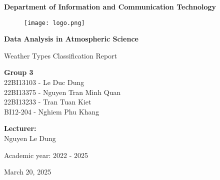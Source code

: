 \documentclass{article}
\begin{document}
\begin{titlepage}
    \centering
    \vspace*{1cm}
    
    {\LARGE \bfseries Department of Information and Communication Technology \par}

    \begin{figure}[H]
        \centering
        \texttt{[image: logo.png]}
        \label{fig:enter-label}
    \end{figure}
    
    \vspace{1cm}
    
    {\Huge \bfseries Data Analysis in Atmospheric Science \par}
    
    \vspace{1cm}
    
    {\Large Weather Types Classification Report \par}
    
    \vfill
    
    \begin{minipage}{0.5\textwidth}
        \begin{flushleft}
            {\large \textbf{Group 3}} \\
            22BI13103 - Le Duc Dung\\
            22BI13375 - Nguyen Tran Minh Quan\\
            22BI13233 - Tran Tuan Kiet\\
            BI12-204  - Nghiem Phu Khang
        \end{flushleft}
    \end{minipage}%
    \begin{minipage}{0.5\textwidth}
        \begin{flushright}
            {\large \textbf{Lecturer:}} \\
            Nguyen Le Dung
        \end{flushright}
    \end{minipage}
    
    \vspace{2cm}
    
    {\large Academic year: 2022 - 2025} \par
    
    \vspace{1cm}
    
    {March 20, 2025}
    
\end{titlepage}
\end{document}
